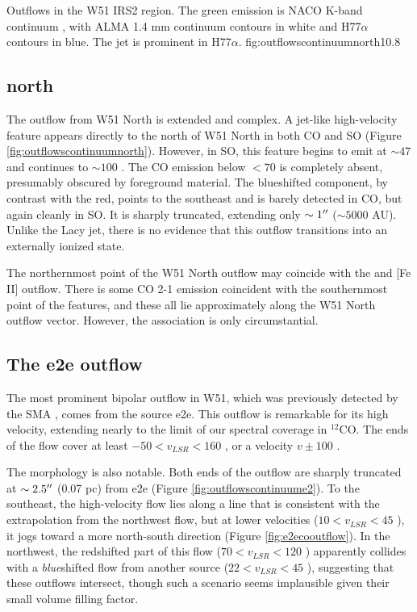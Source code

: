 \documentclass[twocolumn]{aastex61}
\begin{document}
{Outflows in the W51 IRS2 region.  The green emission is NACO K-band continuum
\citep{Figueredo2008a,Barbosa2008a}, with ALMA 1.4 mm continuum contours in white and
H77$\alpha$ contours in blue.  The \citet{Lacy2007a} jet is prominent in
H77$\alpha$.}
{fig:outflowscontinuumnorth}{1}{0.8\textwidth}

\subsection{north}
The outflow from W51 North is extended and complex.  A jet-like high-velocity
feature appears directly to the north of W51 North in both CO and SO (Figure
\ref{fig:outflowscontinuumnorth}).  However, in SO, this feature begins to emit
at $\sim47$ \kms and continues to $\sim 100$ \kms.  The CO emission below $<70$
\kms is completely absent, presumably obscured by foreground material.  The
blueshifted component, by contrast with the red, points to the southeast and is
barely detected in CO, but again cleanly in SO.  It is sharply truncated,
extending only $\sim1 \mbox{$^{\prime\prime}$}$ ($\sim5000$ AU).  Unlike the Lacy jet, there is
no evidence that this outflow transitions into an externally ionized state.

The northernmost point of the W51 North outflow may coincide with
the \citet{Hodapp2002a} \hh and [Fe II] outflow.  There is some CO 2-1
emission coincident with the southernmost point of the \hh features,
and these all lie approximately along the W51 North outflow vector.
However, the association is only circumstantial.


\subsection{The e2e outflow}
The most prominent bipolar outflow in W51, which was previously detected by the
SMA \citep{Shi2010b,Shi2010a}, comes from the source e2e.  This outflow is
remarkable for its high velocity, extending nearly to the limit of our spectral
coverage in $^{12}$CO.  The ends of the flow cover at least $-50 < v_{LSR} <
160$ \kms, or a velocity $v\pm100$ \kms.  

The morphology is also notable.  Both ends of the outflow are sharply truncated
at $\sim2.5\mbox{$^{\prime\prime}$}$ (0.07 pc) from e2e (Figure \ref{fig:outflowscontinuume2}).
To the southeast, the high-velocity flow lies along a line that is consistent
with the extrapolation from the northwest flow, but at lower velocities ($10 <
v_{LSR} < 45$ \kms), it jogs toward a more north-south direction (Figure
\ref{fig:e2ecooutflow}).  In the
northwest, the redshifted part of this flow ($70 < v_{LSR} < 120$ \kms)
apparently collides with a \emph{blue}shifted flow from another source ($22 <
v_{LSR} < 45$ \kms), suggesting that these outflows intersect, though such a
scenario seems  implausible given their small volume filling factor.
\end{document}
